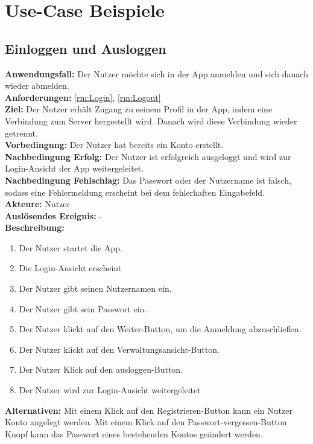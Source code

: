 \documentclass[parskip=full]{scrartcl}
\newcommand{\changelocaltocdepth}[1]{%
  \addtocontents{toc}{\protect\setcounter{tocdepth}{#1}}%
  \setcounter{tocdepth}{#1}%
}
\newcommand{\enablesubsectionnumbering}[1]{
    \renewcommand{\thesubsection}{$\langle$#1\arabic{subsection}0$\rangle$}
    \changelocaltocdepth{1} 
}
\begin{document}
\section{Use-Case Beispiele}

\enablesubsectionnumbering{F}
\subsection{Einloggen und Ausloggen}
\textbf{Anwendungsfall:} Der Nutzer möchte sich in der App anmelden und sich danach wieder abmelden.\\
\textbf{Anforderungen:} \ref{rm:Login}, \ref{rm:Logout}\\
\textbf{Ziel:} Der Nutzer erhält Zugang zu seinem Profil in der App, indem eine Verbindung zum Server hergestellt wird. Danach wird diese Verbindung wieder getrennt.\\
\textbf{Vorbedingung:} Der Nutzer hat bereits ein Konto erstellt.\\
\textbf{Nachbedingung Erfolg:} Der Nutzer ist erfolgreich ausgeloggt und wird zur Login-Ansicht der App weitergeleitet.\\
\textbf{Nachbedingung Fehlschlag:} Das Passwort oder der Nutzername ist falsch, sodass eine Fehlermeldung erscheint bei dem fehlerhaften Eingabefeld.\\
\textbf{Akteure:} Nutzer\\
\textbf{Auslösendes Ereignis:} -\\
\textbf{Beschreibung:}
\begin{enumerate}
    \item Der Nutzer startet die App.
    \item Die Login-Ansicht erscheint
    \item Der Nutzer gibt seinen Nutzernamen ein.
    \item Der Nutzer gibt sein Passwort ein.
    \item Der Nutzer klickt auf den Weiter-Button, um die Anmeldung abzuschließen.
    \item Der Nutzer klickt auf den Verwaltungsansicht-Button.
    \item Der Nutzer Klick auf den ausloggen-Button.
    \item Der Nutzer wird zur Login-Ansicht weitergeleitet
\end{enumerate}
\textbf{Alternativen:} Mit einem Klick auf den Registrieren-Button kann ein Nutzer Konto angelegt werden. Mit einem Klick auf den Passwort-vergessen-Button Knopf kann das Passwort eines bestehenden Kontos geändert werden.
\newpage
\end{document}
